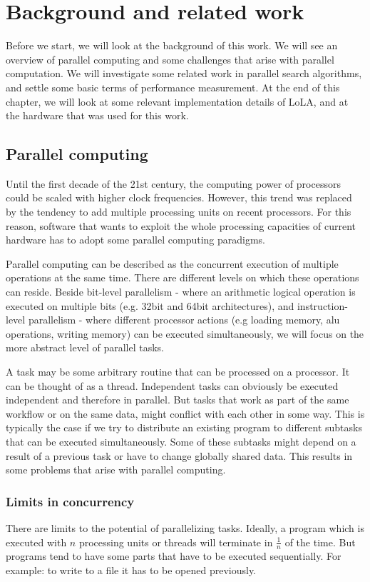 \chapter{Background and related work}
Before we start, we will look at the background of this work. We will see an overview of parallel computing and some challenges that arise with parallel computation. We will investigate some related work in parallel search algorithms, and settle some basic terms of performance measurement. At the end of this chapter, we will look at some relevant implementation details of LoLA, and at the hardware that was used for this work.

\section{Parallel computing}
Until the first decade of the 21st century, the computing power of processors could be scaled with higher clock frequencies. However, this trend was replaced by the tendency to add multiple processing units on recent processors. For this reason, software that wants to exploit the whole processing capacities of current hardware has to adopt some parallel computing paradigms.

Parallel computing can be described as the concurrent execution of multiple operations at the same time. There are different levels on which these operations can reside. Beside bit-level parallelism - where an arithmetic logical operation is executed on multiple bits (e.g. 32bit and 64bit architectures), and instruction-level parallelism\cite{wall1991limits} - where different processor actions (e.g loading memory, alu operations, writing memory) can be executed simultaneously, we will focus on the more abstract level of parallel tasks.

A task may be some arbitrary routine that can be processed on a processor. It can be thought of as a thread. Independent tasks can obviously be executed independent and therefore in parallel. But tasks that work as part of the same workflow or on the same data, might conflict with each other in some way. This is typically the case if we try to distribute an existing program to different subtasks that can be executed simultaneously. Some of these subtasks might depend on a result of a previous task or have to change globally shared data. This results in some problems that arise with parallel computing.

\subsection{Limits in concurrency}
There are limits to the potential of parallelizing tasks. Ideally, a program which is executed with $n$ processing units or threads will terminate in $\frac{1}{n}$ of the time. But programs tend to have some parts that have to be executed sequentially. For example: to write to a file it has to be opened previously.

